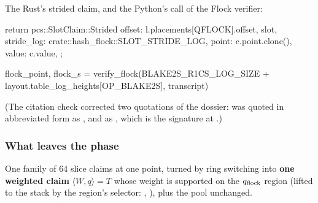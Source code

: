 The Rust's strided claim, and the Python's call of the Flock verifier:

\begin{srccode}
return pcs::SlotClaim::Strided {
    offset: l.placements[QFLOCK].offset,
    slot,
    stride_log: crate::hash_flock::SLOT_STRIDE_LOG,
    point: c.point.clone(),
    value: c.value,
};
\end{srccode}

\begin{srccode}
flock_point, flock_s = verify_flock(BLAKE2S_R1CS_LOG_SIZE + layout.table_log_heights[OP_BLAKE2S], transcript)
\end{srccode}

\begin{sloppypar}
(The citation check corrected two quotations of the dossier:  was
quoted in abbreviated form as , and  as , which is the signature at .)
\end{sloppypar}

\subsubsection{What leaves the phase}\label{sec:gen-flock-ring-output}

One family of 64 slice claims at one point, turned by ring switching into \textbf{one weighted
claim} $⟨W, q⟩ = T$ whose weight is supported on the $q_{\mathrm{flock}}$ region (lifted to the stack by the
region's selector: , ), plus the pool unchanged.
